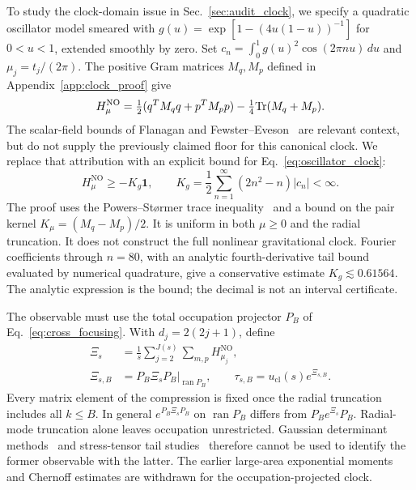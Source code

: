To study the clock-domain issue in Sec.~\ref{sec:audit_clock}, we specify a quadratic oscillator model smeared with
$g(u)=\exp[1-(4u(1-u))^{-1}]$ for $0<u<1$, extended smoothly by zero.
Set $c_n=\int_0^1g(u)^2\cos(2\pi n u)\,du$ and $\mu_j=t_j/(2\pi)$.
The positive Gram matrices $M_q,M_p$ defined in Appendix~\ref{app:clock_proof} give
\begin{equation}\label{eq:oscillator_clock}
H_\mu^{\mathrm{NO}}=\tfrac12(q^TM_q q+p^TM_p p)
-\tfrac14\mathrm{Tr}(M_q+M_p).
\end{equation}
The scalar-field bounds of Flanagan and Fewster--Eveson~\cite{Flanagan1997,FewsterEveson1998} are relevant context, but do not supply the previously claimed floor for this canonical clock. We replace that attribution with an explicit bound for Eq.~\eqref{eq:oscillator_clock}:
\begin{equation}\label{eq:clock_floor}
H_\mu^{\mathrm{NO}}\ge-K_g\mathbf1,\qquad
K_g=\frac12\sum_{n=1}^{\infty}(2n^2-n)|c_n|<\infty.
\end{equation}
The proof uses the Powers--St\o rmer trace inequality~\cite{PowersStormer1970} and a bound on the pair kernel $K_\mu=(M_q-M_p)/2$. It is uniform in both $\mu\ge0$ and the radial truncation. It does not construct the full nonlinear gravitational clock. Fourier coefficients through $n=80$, with an analytic fourth-derivative tail bound evaluated by numerical quadrature, give a conservative estimate $K_g\lesssim0.61564$. The analytic expression is the bound; the decimal is not an interval certificate.

The observable must use the total occupation projector $P_B$ of Eq.~\eqref{eq:cross_focusing}. With $d_j=2(2j+1)$, define
\begin{align}\label{eq:compressed_clock}
\Xi_s&=\frac1s\sum_{j=2}^{J(s)}\sum_{m,p}H_{\mu_j}^{\mathrm{NO}},\nonumber\\
\Xi_{s,B}&=\left.P_B\Xi_sP_B\right|_{\operatorname{ran}P_B},\qquad
\tau_{s,B}=u_{\mathrm{cl}}(s)e^{\Xi_{s,B}}.
\end{align}
Every matrix element of the compression is fixed once the radial truncation includes all $k\le B$. In general $e^{P_B\Xi_sP_B}$ on $\operatorname{ran}P_B$ differs from $P_Be^{\Xi_s}P_B$. Radial-mode truncation alone leaves occupation unrestricted. Gaussian determinant methods~\cite{BalianBrezin1969} and stress-tensor tail studies~\cite{FewsterFordRoman2010} therefore cannot be used to identify the former observable with the latter. The earlier large-area exponential moments and Chernoff estimates are withdrawn for the occupation-projected clock.

